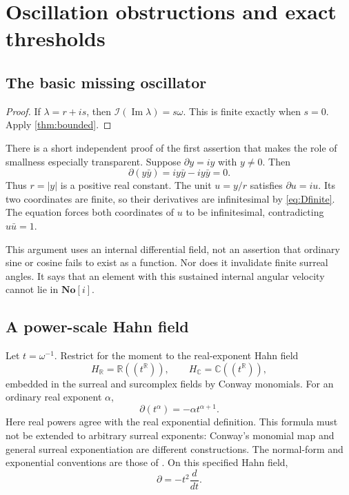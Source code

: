 \documentclass[11pt,a4paper]{article}
\numberwithin{equation}{section}
\newtheorem{corollary}[theorem]{Corollary}
\theoremstyle{definition}
\theoremstyle{remark}
\newcommand{\No}{\mathbf{No}}
\newcommand{\E}{\mathbb E}
\newcommand{\R}{\mathbb R}
\newcommand{\C}{\mathbb C}
\newcommand{\D}{\partial}
\newcommand{\I}{\mathcal I}
\newcommand{\Imm}{\operatorname{Im}}
\newcommand{\abs}[1]{\lvert#1\rvert}
\begin{document}
\section{Oscillation obstructions and exact thresholds}\label{sec:examples}

\subsection{The basic missing oscillator}
\begin{proof}
If $\lambda=r+is$, then $\I(\Imm\lambda)=s\omega$.
This is finite exactly when $s=0$. Apply \cref{thm:bounded}.
\end{proof}
There is a short independent proof of the first assertion that makes the
role of smallness especially transparent. Suppose $\D y=iy$ with $y\ne0$.
Then
\[
 \D(y\bar y)=iy\bar y-iy\bar y=0.
\]
Thus $r=\abs y$ is a positive real constant. The unit $u=y/r$ satisfies
$\D u=iu$. Its two coordinates are finite, so their derivatives are
infinitesimal by \eqref{eq:Dfinite}. The equation forces both coordinates
of $u$ to be infinitesimal, contradicting $u\bar u=1$.

This argument uses an internal differential field, not an assertion that
ordinary sine or cosine fails to exist as a function. Nor does it invalidate
finite surreal angles. It says that an element with this sustained internal
angular velocity cannot lie in $\No[i]$.

\subsection{A power-scale Hahn field}
Let $t=\omega^{-1}$. Restrict for the moment to the real-exponent Hahn field
\[
 H_{\R}=\R((t^{\R})),\qquad H_{\C}=\C((t^{\R})),
\]
embedded in the surreal and surcomplex fields by Conway monomials.
For an ordinary real exponent $\alpha$,
\begin{equation}\label{eq:power-D}
 \D(t^{\alpha})=-\alpha t^{\alpha+1}.
\end{equation}
Here real powers agree with the real exponential definition. This formula
must not be extended to arbitrary surreal exponents: Conway's monomial
map and general surreal exponentiation are different constructions. The
normal-form and exponential conventions are those of \cite{BM}.
On this specified Hahn field,
\[
 \D=-t^2\frac{d}{dt}.
\]
\end{document}
